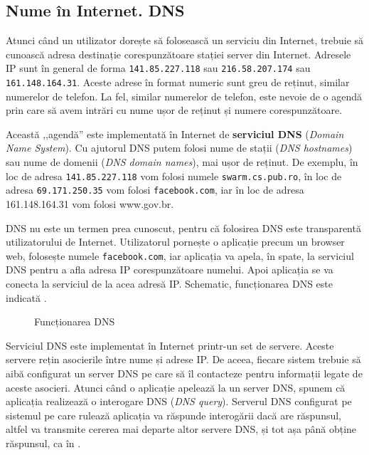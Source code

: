 \subsection{Nume în Internet. DNS}
\label{sec:net:internet:dns}

Atunci când un utilizator dorește să folosească un serviciu din Internet, trebuie să cunoască adresa destinație corespunzătoare stației server din Internet.
Adresele IP sunt în general de forma \texttt{141.85.227.118} sau \texttt{216.58.207.174} sau \texttt{161.148.164.31}.
Aceste adrese în format numeric sunt greu de reținut, similar numerelor de telefon.
La fel, similar numerelor de telefon, este nevoie de o agendă prin care să avem intrări cu nume ușor de reținut și numere corespunzătoare.

Această ,,agendă'' este implementată în Internet de \textbf{serviciul DNS}  (\textit{Domain Name System}).
Cu ajutorul DNS putem folosi nume de stații (\textit{DNS hostnames}) sau nume de domenii (\textit{DNS domain names}), mai ușor de reținut.
De exemplu, în loc de adresa \texttt{141.85.227.118} vom folosi numele \texttt{swarm.cs.pub.ro}, în loc de adresa \texttt{69.171.250.35} vom folosi \texttt{facebook.com}, iar în loc de adresa 161.148.164.31 vom folosi www.gov.br.

DNS nu este un termen prea cunoscut, pentru că folosirea DNS este transparentă utilizatorului de Internet.
Utilizatorul pornește o aplicație precum un browser web, folosește numele \texttt{facebook.com}, iar aplicația va apela, în spate, la serviciul DNS pentru a afla adresa IP corespunzătoare numelui.
Apoi aplicația se va conecta la serviciul de la acea adresă IP.
Schematic, funcționarea DNS este indicată .

\begin{figure}[htbp]
  \centering
  \def\svgwidth{\columnwidth}
  
  \caption{Funcționarea DNS}
  \label{fig:net:dns}
\end{figure}

Serviciul DNS este implementat în Internet printr-un set de servere.
Aceste servere rețin asocierile între nume și adrese IP.
De aceea, fiecare sistem trebuie să aibă configurat un server DNS pe care să îl contacteze pentru informații legate de aceste asocieri.
Atunci când o aplicație apelează la un server DNS, spunem că aplicația realizează o interogare DNS (\textit{DNS query}).
Serverul DNS configurat pe sistemul pe care rulează aplicația va răspunde interogării dacă are răspunsul, altfel va transmite cererea mai departe altor servere DNS, și tot așa până obține răspunsul, ca în .

